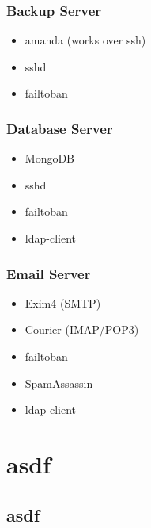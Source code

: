 		\subsubsection{Backup Server}		
		\begin{itemize}
			\item amanda (works over ssh)
			\item sshd
			\item failtoban
		\end{itemize}		
		\subsubsection{Database Server}
			\begin{itemize}
				\item MongoDB
				\item sshd
				\item failtoban
				\item ldap-client
			\end{itemize}
		\subsubsection{Email Server}
			\begin{itemize}
				\item Exim4 (SMTP)
				\item Courier (IMAP/POP3)
				\item failtoban
				\item SpamAssassin
				\item ldap-client
			\end{itemize}
		
\section{asdf}
	\subsection{asdf}


		
